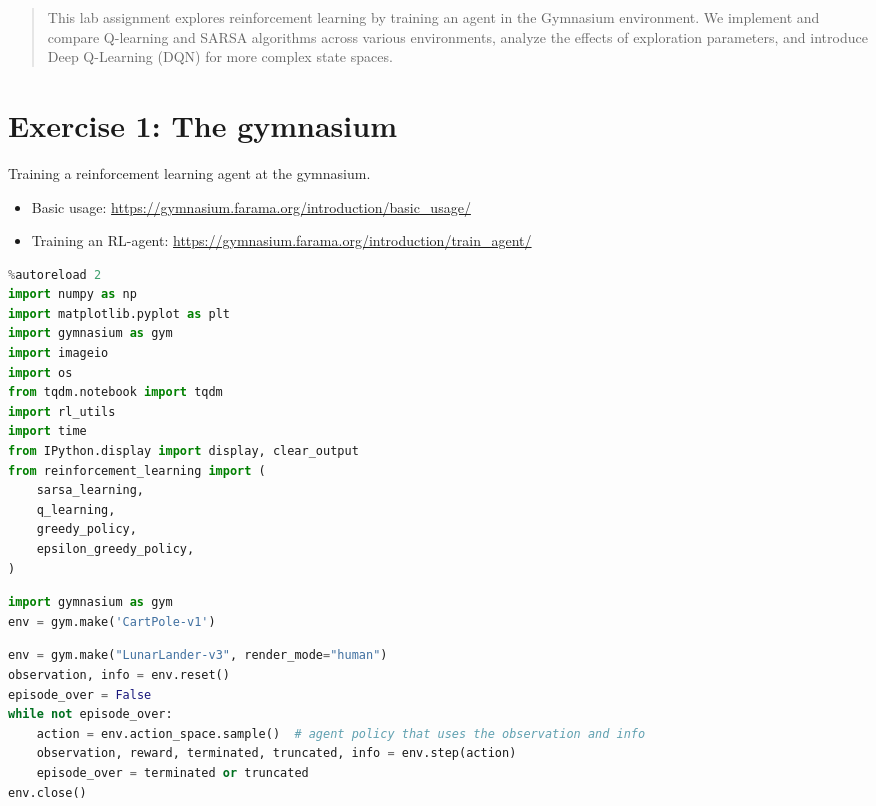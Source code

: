 \documentclass[11pt,a4paper]{article}
\begin{document}

\begin{abstract}
This lab assignment explores reinforcement learning by training an agent in the Gymnasium environment. We implement and compare Q-learning and SARSA algorithms across various environments, analyze the effects of exploration parameters, and introduce Deep Q-Learning (DQN) for more complex state spaces.
\end{abstract}

\tableofcontents
\newpage

\section{Exercise 1: The gymnasium}

Training a reinforcement learning agent at the gymnasium. 
\begin{itemize}
    \item Basic usage: \url{https://gymnasium.farama.org/introduction/basic_usage/}
    \item Training an RL-agent: \url{https://gymnasium.farama.org/introduction/train_agent/}
\end{itemize}

\begin{lstlisting}[language=Python]
%load_ext autoreload
%autoreload 2
import numpy as np
import matplotlib.pyplot as plt
import gymnasium as gym
import imageio
import os
from tqdm.notebook import tqdm
import rl_utils
import time
from IPython.display import display, clear_output
from reinforcement_learning import (
    sarsa_learning,
    q_learning, 
    greedy_policy,
    epsilon_greedy_policy,
)
\end{lstlisting}

\begin{lstlisting}[language=Python]
import gymnasium as gym
env = gym.make('CartPole-v1')
\end{lstlisting}

\begin{lstlisting}[language=Python]
env = gym.make("LunarLander-v3", render_mode="human")
observation, info = env.reset()
episode_over = False
while not episode_over:
    action = env.action_space.sample()  # agent policy that uses the observation and info
    observation, reward, terminated, truncated, info = env.step(action)
    episode_over = terminated or truncated
env.close()
\end{lstlisting}
\end{document}
